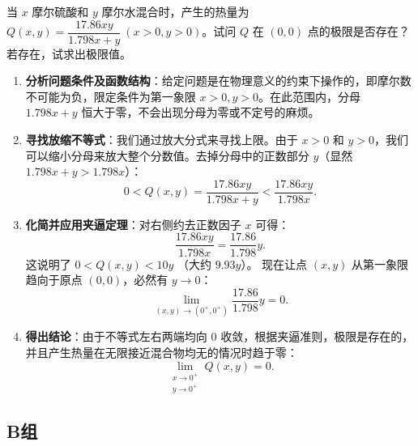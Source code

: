 \documentclass[lang=cn,11pt]{elegantbook}
\begin{document}
\begin{exercise}[实际问题中的极限]
当 $x$ 摩尔硫酸和 $y$ 摩尔水混合时，产生的热量为 $Q(x,y) = \dfrac{17.86xy}{1.798x+y}\ (x>0,y>0)$。试问 $Q$ 在 $(0,0)$ 点的极限是否存在？若存在，试求出极限值。
\end{exercise}
\begin{solution}
\begin{enumerate}
  \item \textbf{分析问题条件及函数结构}：给定问题是在物理意义的约束下操作的，即摩尔数不可能为负，限定条件为第一象限 $x>0, y>0$。在此范围内，分母 $1.798x+y$ 恒大于零，不会出现分母为零或不定号的麻烦。
  \item \textbf{寻找放缩不等式}：我们通过放大分式来寻找上限。由于 $x>0$ 和 $y>0$，我们可以缩小分母来放大整个分数值。去掉分母中的正数部分 $y$（显然 $1.798x+y > 1.798x$）：
  \[
  0 < Q(x,y) = \frac{17.86xy}{1.798x+y} < \frac{17.86xy}{1.798x}.
  \]
  \item \textbf{化简并应用夹逼定理}：对右侧约去正数因子 $x$ 可得：
  \[
  \frac{17.86xy}{1.798x} = \frac{17.86}{1.798}y.
  \]
  这说明了 $0 < Q(x,y) < 10 y$ （大约 $9.93 y$）。
  现在让点 $(x,y)$ 从第一象限趋向于原点 $(0,0)$，必然有 $y \to 0$：
  \[
  \lim_{(x,y)\to(0^+,0^+)} \frac{17.86}{1.798}y = 0.
  \]
  \item \textbf{得出结论}：由于不等式左右两端均向 $0$ 收敛，根据夹逼准则，极限是存在的，并且产生热量在无限接近混合物均无的情况时趋于零：
  \[
  \boxed{\lim_{\substack{x\to 0^+ \\ y\to 0^+}} Q(x,y) = 0}.
  \]
\end{enumerate}
\end{solution}

\subsection{B组}
\end{document}
